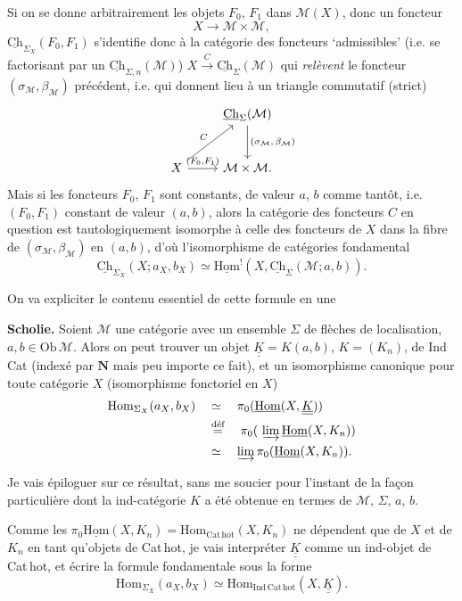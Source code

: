 \documentclass[11pt]{article}
\newcommand{\printedpage}[1]{\marginpar{\footnotesize p.~#1}}
\newcommand{\msp}[1]{\marginpar{\footnotesize [#1]}}
\newcommand{\cM}{\mathcal{M}}
\newcommand{\Ch}{\underline{\mathrm{Ch}}}
\newcommand{\KK}{\underline{\underline{K}}}
\newcommand{\dfeq}{\overset{\text{déf}}{=}}
\newcommand{\Cathot}{\mathrm{Cat\,hot}}
\newcommand{\uHom}{\underline{\mathrm{Hom}}}
\begin{document}
Si on se donne arbitrairement les objets $F_0$, $F_1$ dans $\cM(X)$, donc un foncteur
\[
X\longrightarrow\cM\times\cM,
\]
$\Ch_{\Sigma_X}(F_0,F_1)$ s'identifie donc à la catégorie des foncteurs ‘admissibles’ (i.e. se factorisant par un $\Ch_{\Sigma,n}(\cM)$) $X\xrightarrow{\ C\ }\Ch_{\Sigma}(\cM)$ qui \textit{relèvent}
\msp{page 32: blank}
\msp{page 33}
le foncteur $(\sigma_{\cM},\beta_{\cM})$ précédent, i.e. qui donnent lieu à un triangle commutatif (strict)
\[
\begin{tikzcd}[row sep=large]
 & \Ch_{\Sigma}(\cM) \arrow[d, "{(\sigma_{\cM},\,\beta_{\cM})}"] \\
X \arrow[ur, "C"] \arrow[r, "{(F_0,F_1)}"] & \cM\times\cM.
\end{tikzcd}
\]
Mais si les foncteurs $F_0$, $F_1$ sont constants, de valeur $a$, $b$ comme tantôt, i.e. $(F_0,F_1)$ constant de valeur $(a,b)$, alors la catégorie des foncteurs $C$ en question est tautologiquement isomorphe à celle des foncteurs de $X$ dans la fibre de $(\sigma_{\cM},\beta_{\cM})$ en $(a,b)$, d'où l'isomorphisme de catégories fondamental
\[
\boxed{\Ch_{\Sigma_X}(X;a_X,b_X)\simeq\uHom^{!}(X,\Ch_{\Sigma}(\cM;a,b)).}
\]

On va expliciter le contenu essentiel de cette formule en une

\textbf{Scholie.} Soient $\cM$ une catégorie avec un ensemble $\Sigma$ de flèches de localisation, $a,b\in\mathrm{Ob}\,\cM$. Alors on peut trouver un objet $\KK=K(a,b)$, $K=(K_n)$, de Ind\,Cat (indexé par $\mathbf{N}$ mais peu importe ce fait), et un isomorphisme canonique pour toute catégorie $X$ (isomorphisme fonctoriel en $X$)
\[
\begin{aligned}
\mathrm{Hom}_{\Sigma_X}(a_X,b_X) \quad &\simeq \quad \pi_0(\uHom(X,\KK)) \\
&\dfeq \quad \pi_0(\ \varinjlim \uHom(X,K_n)) \\
&\simeq \quad \varinjlim \pi_0(\uHom(X,K_n)).
\end{aligned}
\]

\printedpage{21}

\msp{page 34}
Je vais épiloguer sur ce résultat, sans me soucier pour l'instant de la façon particulière dont la ind-catégorie $K$ a été obtenue en termes de $\cM$, $\Sigma$, $a$, $b$.

Comme les $\pi_0\uHom(X,K_n)=\mathrm{Hom}_{\Cathot}(X,K_n)$ ne dépendent que de $X$ et de $K_n$ en tant qu'objets de Cat\,hot, je vais interpréter $\KK$ comme un ind-objet de Cat\,hot, et écrire la formule fondamentale sous la forme
\[
\mathrm{Hom}_{\Sigma_X}(a_X,b_X)\simeq\mathrm{Hom}_{\mathrm{Ind\,Cat\,hot}}(X,\KK).
\]
\end{document}
